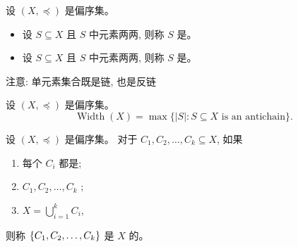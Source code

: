 \begin{frame}{}
  \begin{definition}
    设 $(X, \preceq)$ 是偏序集。

    \begin{itemize}
      \setlength{\itemsep}{6pt}
      \item 设 $S \subseteq X$ 且 $S$ 中元素两两, 则称 $S$ 是。
      \item 设 $S \subseteq X$ 且 $S$ 中元素两两, 则称 $S$ 是。
    \end{itemize}
  \end{definition}

  \begin{center}
    注意: 单元素集合既是链, 也是反链
  \end{center}

\end{frame}

\begin{frame}{}
  \begin{definition}[宽度 (Width)]
    设 $(X, \preceq)$ 是偏序集。
    \[
      \operatorname{Width}(X) =
      \max\{|S|: S \subseteq X \text{ is an antichain}\}.
    \]
  \end{definition}

\end{frame}

\begin{frame}{}
  \begin{definition}
    设 $(X, \preceq)$ 是偏序集。
    对于 $C_{1}, C_{2}, \dots, C_{k} \subseteq X$, 如果
    \begin{enumerate}
      \setlength{\itemsep}{6pt}
      \item 每个 $C_{i}$ 都是;
      \item $C_{1}, C_{2}, \dots, C_{k}$ ;
      \item $X = \bigcup_{i=1}^{k} C_{i}$,
    \end{enumerate}
    则称 $\{C_{1}, C_{2}, \dots, C_{k}\}$
    是 $X$ 的。
  \end{definition}

\end{frame}


